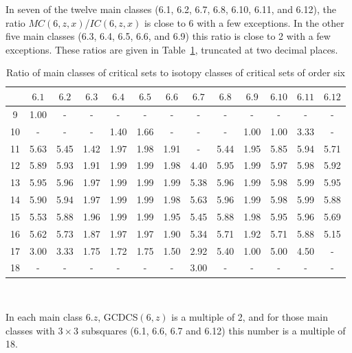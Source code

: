 \documentclass[12pt]{report}
\begin{document}
In seven of the twelve main classes (6.1, 6.2, 6.7, 6.8,
6.10, 6.11, and 6.12), the ratio $MC(6,z,x)$/$IC(6,z,x)$ is close to 6 with a few exceptions.
In the other five main classes (6.3, 6.4, 6.5, 6.6, and 6.9) this ratio
is close to 2 with a few exceptions.  These ratios are given in Table~\ref{eight}, truncated at
two decimal places.

\begin{table}
\begin{center}
\caption{Ratio of main classes of critical sets to isotopy classes of critical sets of order six \vspace {3mm}}
\label{eight}
\begin{tabular}{|c|c|c|c|c|c|c|c|c|c|c|c|c|} \hline
& $6.1$ & $6.2$ & $6.3$ & $6.4$ & $6.5$ & $6.6$ & $6.7$ & $6.8$ & $6.9$ & $6.10$ & $6.11$ & $6.12$ \\
\hline
9 &   1.00 &   -  &  -   &  -   &  -   &  -   &  -   &  -   &   -  &  -   &  -   &  - \\
10 &   -   &   -  &  -   & 1.40 & 1.66 &  -   &  -   &  -   & 1.00 & 1.00 & 3.33 &  - \\
11 &  5.63 & 5.45 & 1.42 & 1.97 & 1.98 & 1.91 &  -   & 5.44 & 1.95 & 5.85 & 5.94 & 5.71  \\
12 &  5.89 & 5.93 & 1.91 & 1.99 & 1.99 & 1.98 & 4.40 & 5.95 & 1.99 & 5.97 & 5.98 & 5.92 \\
13 &  5.95 & 5.96 & 1.97 & 1.99 & 1.99 & 1.99 & 5.38 & 5.96 & 1.99 & 5.98 & 5.99 & 5.95 \\
14 &  5.90 & 5.94 & 1.97 & 1.99 & 1.99 & 1.98 & 5.63 & 5.96 & 1.99 & 5.98 & 5.99 & 5.88 \\
15 &  5.53 & 5.88 & 1.96 & 1.99 & 1.99 & 1.95 & 5.45 & 5.88 & 1.98 & 5.95 & 5.96 & 5.69 \\
16 &  5.62 & 5.73 & 1.87 & 1.97 & 1.97 & 1.90 & 5.34 & 5.71 & 1.92 & 5.71 & 5.88 & 5.15 \\
17 &  3.00 & 3.33 & 1.75 & 1.72 & 1.75 & 1.50 & 2.92 & 5.40 & 1.00 & 5.00 & 4.50 &  - \\
18 &   -   &   -  &  -   &  -   &  -   &  -   & 3.00 &  -   &  -   &  -   &  -   &  -  \\
\hline
\end{tabular}\vspace {3mm} \\
\end{center}
\end{table}

In each main class $6.z$, GCDCS$(6,z)$ is a multiple of
2, and for those main classes with $3 \times 3$ subsquares (6.1, 6.6,
6.7 and 6.12) this number is a multiple of 18.
\end{document}
